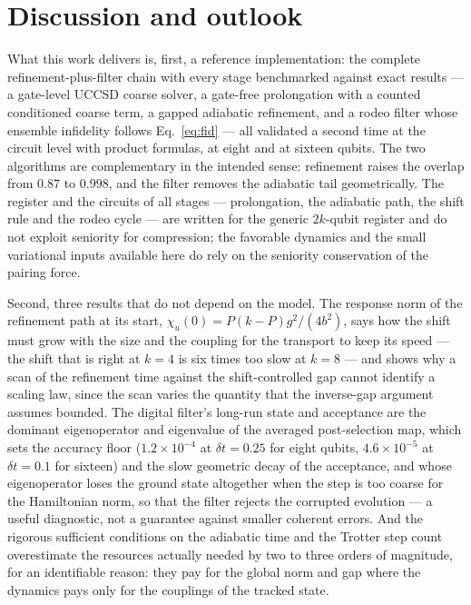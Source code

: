 \documentclass[
  aps,            %
  prc,            %
  reprint,        %
  superscriptaddress,
  floatfix,
  nofootinbib
]{revtex4-2}
\begin{document}
\section{Discussion and outlook}
\label{sec:discussion}
What this work delivers is, first, a reference implementation: the
complete refinement-plus-filter chain with every stage benchmarked against
exact results --- a gate-level UCCSD coarse solver, a gate-free prolongation
with a counted conditioned coarse term, a gapped adiabatic refinement, and a
rodeo filter whose ensemble infidelity follows Eq.~\eqref{eq:fid} --- all
validated a second time at the circuit level with product formulas, at
eight and at sixteen qubits.  The two algorithms are complementary in the
intended sense: refinement raises the overlap from $0.87$ to $0.998$, and
the filter removes the adiabatic tail geometrically.  The register and the
circuits of all stages --- prolongation, the adiabatic path, the shift rule
and the rodeo cycle --- are written for the generic $2k$-qubit register and
do not exploit seniority for compression; the favorable dynamics and the
small variational inputs available here do rely on the seniority
conservation of the pairing force.

Second, three results that do not depend on the model.  The response norm
of the refinement path at its start, $\chi_u(0)=P(k-P)g^2/(4b^2)$, says how
the shift must grow with the size and the coupling for the transport to
keep its speed --- the shift that is right at $k=4$ is six times too slow at
$k=8$ --- and shows why a scan of the refinement time against the
shift-controlled gap cannot identify a scaling law, since the scan varies
the quantity that the inverse-gap argument assumes bounded.  The digital
filter's long-run state and acceptance are the dominant eigenoperator and
eigenvalue of the averaged post-selection map, which sets the accuracy
floor ($1.2\times10^{-4}$ at $\delta t=0.25$ for eight qubits,
$4.6\times10^{-5}$ at $\delta t=0.1$ for sixteen) and the slow geometric
decay of the acceptance, and whose eigenoperator loses the ground state
altogether when the step is too coarse for the Hamiltonian norm, so that the
filter rejects the corrupted evolution --- a useful diagnostic, not a
guarantee against smaller coherent errors.  And the rigorous sufficient
conditions on the adiabatic time and the Trotter step count overestimate the
resources actually needed by two to three orders of magnitude, for an
identifiable reason: they pay for the global norm and gap where the dynamics
pays only for the couplings of the tracked state.
\end{document}
